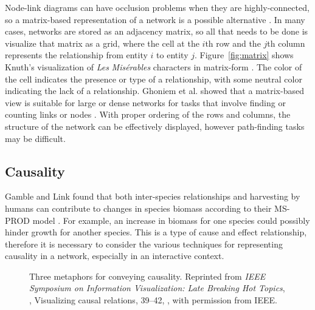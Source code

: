 Node-link diagrams can have occlusion problems when they are highly-connected, so a matrix-based representation of a network is a possible alternative \cite{heer2010}.  In many cases, networks are stored as an adjacency matrix, so all that needs to be done is visualize that matrix as a grid, where the cell at the $i$th row and the $j$th column represents the relationship from entity $i$ to entity $j$.  Figure~\ref{fig:matrix} shows Knuth's visualization of \textit{Les} \textit{Mis\'erables} characters in matrix-form \cite{knuth1993}.  The color of the cell indicates the presence or type of a relationship, with some neutral color indicating the lack of a relationship.  Ghoniem et al. showed that a matrix-based view is suitable for large or dense networks for tasks that involve finding or counting links or nodes \citeyearpar{ghoniem2004}.  With proper ordering of the rows and columns, the structure of the network can be effectively displayed, however path-finding tasks may be difficult.

\subsection{Causality}

Gamble and Link found that both inter-species relationships and harvesting by humans can contribute to changes in species biomass according to their MS-PROD model \cite{gamble2009}.  For example, an increase in biomass for one species could possibly hinder growth for another species.  This is a type of cause and effect relationship, therefore it is necessary to consider the various techniques for representing causality in a network, especially in an interactive context.

\begin{figure}
\centering


\caption[Three metaphors for conveying causality]{Three metaphors for conveying causality.  Reprinted from \textit{IEEE Symposium on Information Visualization: Late Breaking Hot Topics}, \citeauthor{ware1999}, Visualizing causal relations, 39--42, \textcopyright \citeyear{ware1999}, with permission from IEEE.}

	\label{fig:vcv}
\end{figure}

